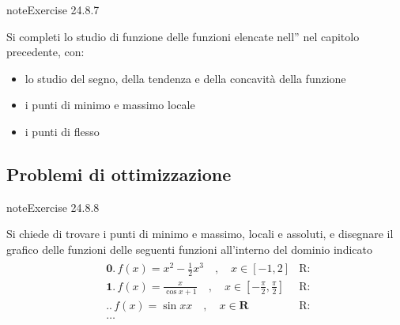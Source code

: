 \documentclass[letterpaper,10pt,italian]{jupyterBook}
\begin{document}
\begin{sphinxadmonition}{note}{Exercise 24.8.7}



\sphinxAtStartPar
Si completi lo studio di funzione delle funzioni elencate nell”{\hyperref[\detokenize{ch/infinitesimal_calculus/analysis-problems:infinitesimal-calculus-analysis-problems-funs}]{}} nel capitolo precedente, con:
\begin{itemize}
\item {} 
\sphinxAtStartPar
lo studio del segno, della tendenza e della concavità della funzione

\item {} 
\sphinxAtStartPar
i punti di minimo e massimo locale

\item {} 
\sphinxAtStartPar
i punti di flesso

\end{itemize}
\end{sphinxadmonition}


\subsection{Problemi di ottimizzazione}
\label{\detokenize{ch/infinitesimal_calculus/derivatives-problems:problemi-di-ottimizzazione}}\label{\detokenize{ch/infinitesimal_calculus/derivatives-problems:infinitesimal-calculus-derivatives-problems-opt}} \label{exercise:ch/infinitesimal_calculus/derivatives-problems-exercise-7}

\begin{sphinxadmonition}{note}{Exercise 24.8.8}



\sphinxAtStartPar
Si chiede di trovare i punti di minimo e massimo, locali e assoluti, e disegnare il grafico delle funzioni delle seguenti funzioni all’interno del dominio indicato
\begin{equation*}
\begin{split}\begin{aligned}
 & \mathbf{0.} \, f(x) = x^2 - \frac{1}{2} x^3 \quad , \quad x \in [-1,2] & \text{R: } \\
 & \mathbf{1.} \, f(x) = \frac{x}{\cos x + 1}  \quad , \quad x \in \left[ -\frac{\pi}{2}, \frac{\pi}{2} \right]  & \text{R: } \\
 & \mathbf{..} \, f(x) = \sin{x}{x} \quad , \quad x \in \mathbf{R} & \text{R: } \\
 & \dots 
\end{aligned}\end{split}
\end{equation*}
\sphinxAtStartPar
{} 
\end{sphinxadmonition}
 \label{exercise:ch/infinitesimal_calculus/derivatives-problems-exercise-8}
\end{document}
